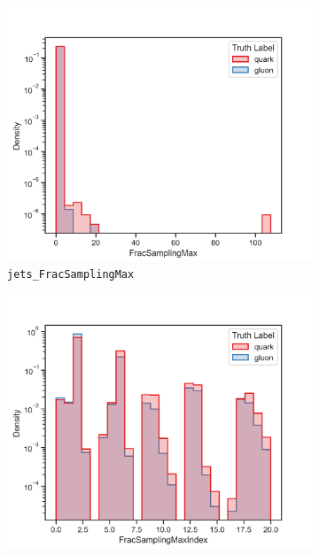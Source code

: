 \begin{figure}[!htb]
	\centering
	\begin{subfigure}[t]{0.48\textwidth}
		\includegraphics[width=1\textwidth]{src/plots/distributions/highlevel/jets_FracSamplingMax.png}
		\caption{\texttt{jets\_FracSamplingMax}}
		\label{fig:highlevel_6}
	\end{subfigure}
	\begin{subfigure}[t]{0.48\textwidth}
		\includegraphics[width=1\textwidth]{src/plots/distributions/highlevel/jets_FracSamplingMaxIndex.png}

\end{subfigure}
\end{figure}
